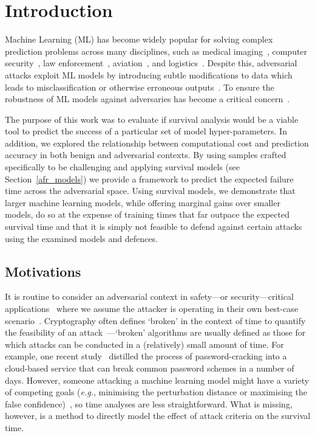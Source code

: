 \section{Introduction}

Machine Learning (ML) has become widely popular for solving complex prediction problems across many disciplines, such as medical imaging~\cite{ai_medical_imaging}, computer security~\cite{ai_security}, law enforcement~\cite{ai_prison}, aviation~\cite{ai_aviation}, and logistics~\cite{ai_luggage}. Despite this, adversarial attacks exploit ML models by introducing subtle modifications to data which leads to misclassification or otherwise erroneous outputs~\cite{chakraborty_adversarial_2018}. To ensure the robustness of ML models against adversaries has become a critical concern~\cite{adversarialpatch,carlini_towards_2017,croce_reliable_2020,hopskipjump,art2018,meyers}.

The purpose of this work was to evaluate if survival analysis would be a viable tool to predict the success of a particular set of model hyper-parameters. In addition, we explored the relationship between computational cost and prediction accuracy in both benign and adversarial contexts.  By using samples crafted specifically to be challenging and applying survival models (see Section~\ref{afr_models}) we provide a framework to predict the expected failure time across the adversarial space. Using survival models, we demonstrate that larger machine learning models, while offering marginal gains over smaller models, do so at the expense of training times that far outpace the expected survival time and that it is simply not feasible to defend against certain attacks using the examined models and defences.



\subsection{Motivations}

It is routine to consider an adversarial context in safety---or security---critical applications~\cite{ai_medical_imaging,ai_security,ai_prison,ai_aviation,ai_luggage} where we assume the attacker is operating in their own best-case scenario~\cite{leurent2020sha,kamal2017study,madry2017towards,pixelattack,deepfool,croce_reliable_2020}. Cryptography often defines `broken' in the context of time to quantify the feasibility of an attack~\cite{leurent2020sha}---`broken' algorithms are usually defined as those for which attacks can be conducted in a (relatively) small amount of time. For example, one recent study~\cite{kamal2017study} distilled the process of password-cracking into a cloud-based service that can break common password schemes in a number of days. However, someone attacking a machine learning model might have a variety of competing goals (\textit{e.g.}, minimising the perturbation distance or maximising the false confidence)~\cite{madry2017towards,hopskipjump,pixelattack,fgm,deepfool}, so time analyses are less straightforward. What is missing, however, is a method to directly model the effect of attack criteria on the survival time.


